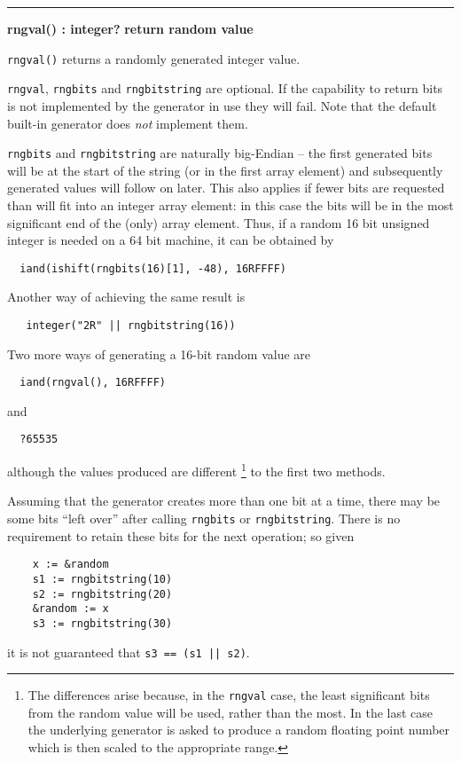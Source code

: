 \documentclass[letterpaper,12pt]{article}
\begin{document}
\bigskip\hrule\vspace{0.1cm}
\noindent
{\bf rngval() : integer? } \hfill {\bf return random value}

\noindent
\texttt{rngval()} returns a  randomly generated integer value.

\bigskip
\texttt{rngval}, \texttt{rngbits} and \texttt{rngbitstring} are optional.  If the
capability to return bits is not implemented by the generator in use they will fail.
Note that the default built-in generator does {\em not} implement them.

\texttt{rngbits} and \texttt{rngbitstring} are naturally big-Endian -- the first
generated bits will be at the start of the string (or in the first array element) and
subsequently generated values will follow on later.  This also applies if fewer bits are
requested than will fit into an integer array element: in this case the bits will be in
the most significant end of the (only) array element. Thus, if a random 16 bit unsigned
integer is needed on a 64 bit machine, it can be obtained by
\begin{verbatim}
  iand(ishift(rngbits(16)[1], -48), 16RFFFF)
\end{verbatim}
Another way of achieving the same result is
\begin{verbatim}
   integer("2R" || rngbitstring(16))
\end{verbatim}
Two more ways of generating a 16-bit random value are
\begin{verbatim}
  iand(rngval(), 16RFFFF)
\end{verbatim}
and
\begin{verbatim}
  ?65535
\end{verbatim}
although the values produced are different%
\footnote{
The differences arise because, in the \texttt{rngval} case, the least significant bits from
the random value will be used, rather than the most. In the last case the underlying
generator is asked to produce a random floating point number which is then scaled to the
appropriate range.
}
to the first two methods.

Assuming that the generator creates more than one bit at a time, there may be some bits
``left over'' after calling \texttt{rngbits} or \texttt{rngbitstring}.  There is no
requirement to retain these bits for the next operation; so given
\begin{verbatim}
    x := &random
    s1 := rngbitstring(10)
    s2 := rngbitstring(20)
    &random := x
    s3 := rngbitstring(30)
\end{verbatim}
it is not guaranteed that \texttt{s3 == (s1 || s2)}.
\end{document}
